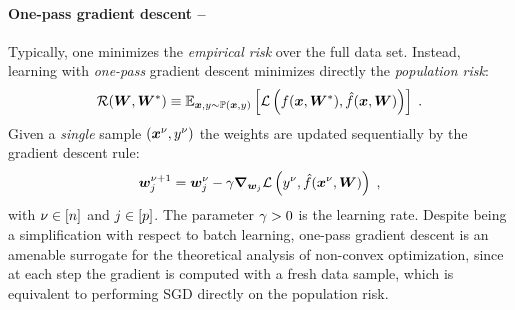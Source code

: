 \documentclass[10pt]{article}
\begin{document}
\paragraph{One-pass gradient descent --} 
Typically, one minimizes the {\it empirical risk} over the full data set. Instead, learning with {\it one-pass} gradient descent minimizes directly the {\it population risk}:
\begin{equation}
    {\cal R} ( \bm{W},  \bm{W}^*  ) \equiv  \operatorname{\mathbb{E}}_{\bm{x}, y \sim \operatorname{\mathbb{P}} (\bm{x}, y)} \left[ {\cal L} \left( f( \bm{x}, \bm{W}^* ), \hat{f} ( \bm{x}, \bm{W} ) \right)    \right]    \;.
\end{equation}
Given a {\it single} sample $(\bm{x}^\nu , y^\nu) $ the weights are updated sequentially by the gradient descent rule:
\begin{equation}\label{eq:w_update}
   \bm{w}^{\nu+1}_{j} = \bm{w}^{\nu}_{j} - \gamma \bm{\nabla}_{\bm{w}_j}{\cal L} \left( y^\nu , \hat{f} ( \bm{x}^{\nu}, \bm{W} ) \right)   \;,
\end{equation}   
with $\nu \in [n]$ and $j \in [p]$. The parameter $\gamma > 0 $ is the learning rate. Despite being a simplification with respect to batch learning, one-pass gradient descent is an amenable surrogate for the theoretical analysis of non-convex optimization, since at each step the gradient is computed with a fresh data sample, which is equivalent to performing SGD directly on the population risk.

\end{document}

